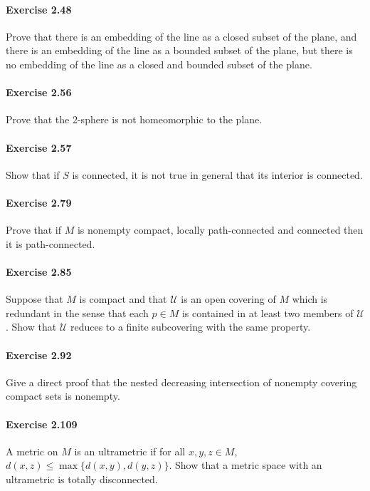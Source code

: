 \documentclass{article}
\begin{document}
\paragraph{Exercise 2.48} Prove that there is an embedding of the line as a closed subset of the plane, and there is an embedding of the line as a bounded subset of the plane, but there is no embedding of the line as a closed and bounded subset of the plane.

\paragraph{Exercise 2.56} Prove that the 2-sphere is not homeomorphic to the plane.

\paragraph{Exercise 2.57} Show that if $S$ is connected, it is not true in general that its interior is connected.

\paragraph{Exercise 2.79} Prove that if $M$ is nonempty compact, locally path-connected and connected then it is path-connected.

\paragraph{Exercise 2.85} Suppose that $M$ is compact and that $\mathcal{U}$ is an open covering of $M$ which is redundant in the sense that each $p \in M$ is contained in at least two members of $\mathcal{U}$. Show that $\mathcal{U}$ reduces to a finite subcovering with the same property.

\paragraph{Exercise 2.92} Give a direct proof that the nested decreasing intersection of nonempty covering compact sets is nonempty.

\paragraph{Exercise 2.109} A metric on $M$ is an ultrametric if for all $x, y, z \in M$, $d(x, z) \leq \max \{d(x, y), d(y, z)\} .$ Show that a metric space with an ultrametric is totally disconnected.
\end{document}
